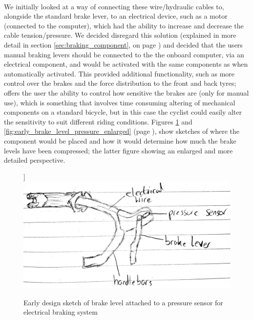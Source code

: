 \documentclass[a4paper]{report}
\begin{document}

\paragraph{}We initially looked at a way of connecting these wire/hydraulic cables to, alongside the standard brake lever, to an electrical device, such as a motor (connected to the computer), which had the ability to increase and decrease the cable tension/pressure. We decided disregard this solution (explained in more detail in section \ref{sec:braking_component}, on page \pageref{sec:braking_component}) and decided that the users manual braking levers should be connected to the the onboard computer, via an electrical component, and would be activated with the same components as when automatically activated. This provided additional functionality, such as more control over the brakes and the force distribution to the front and back tyres; offers the user the ability to control how sensitive the brakes are (only for manual use), which is something that involves time consuming altering of mechanical components on a standard bicycle, but in this case the cyclist could easily alter the sensitivity to suit different riding conditions. Figures \ref{fig:early_brake_level_pressure} and \ref{fig:early_brake_level_pressure_enlarged} (page \pageref{app:early_sketches}), show sketches of where the component would be placed and how it would determine how much the brake levels have been compressed; the latter figure showing an enlarged and more detailed perspective.  

\begin{figure}[!htb]]
\centering
\includegraphics[scale=0.25]{figures/early_sketches/braking_system/brake_lever_pressure_switch}
\caption{Early design sketch of brake level attached to a pressure sensor for electrical braking system}
\label{fig:early_brake_level_pressure}
\end{figure}
\end{document}
